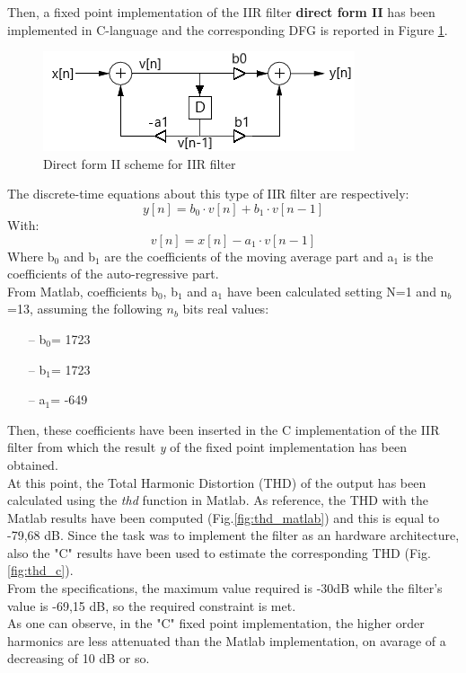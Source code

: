 \documentclass[a4paper, titlepage]{article}
\begin{document}
\noindent
\newline
Then, a fixed point implementation of the IIR filter \textbf{direct form II} has been implemented in C-language and the corresponding DFG is reported in Figure \ref{fig:IIR filter scheme}.
\begin{figure} [h]
\centering
	\includegraphics[scale=0.9]{IIR_filter_scheme.png}
	\caption{Direct form II scheme for IIR filter}
	\label{fig:IIR filter scheme}
\end{figure}
\newline
The discrete-time equations about this type of IIR filter are respectively:
\begin{equation}
\label{eq:IIR eq}
    y[n]=b_0\cdot v[n]+b_1\cdot v[n-1]
\end{equation}
With:
\begin{equation}
\label{eq:IIR eq v[n]}
    v[n]=x[n]-a_1\cdot v[n-1]
\end{equation}
Where b$_0$ and b$_1$ are the coefficients of the moving average part and a$_1$ is the coefficients of the auto-regressive part.\\
From Matlab, coefficients b$_0$, b$_1$ and a$_1$ have been calculated setting N=1 and n$_b$=13, assuming the following $n_b$ bits real values:
\begin{itemize}
    \item[--] b$_0$= 1723
    \item[--] b$_1$= 1723
    \item[--] a$_1$= -649
\end{itemize}
 Then, these coefficients have been inserted in the C implementation of the IIR filter from which the result \textit{y} of the fixed point implementation has been obtained.\\ 
At this point, the Total Harmonic Distortion (THD) of the output has been calculated using the \textit{thd} function in Matlab. As reference, the THD with the Matlab results have been computed (Fig.\ref{fig:thd_matlab}) and this is equal to -79,68 dB. Since the task was to implement the filter as an hardware architecture, also the "C" results have been used to estimate the corresponding THD (Fig.\ref{fig:thd_c}).\\
From the specifications, the maximum value required is -30dB while the filter's value is -69,15 dB, so the required constraint is met.\\
As one can observe, in the "C" fixed point implementation, the higher order harmonics are less attenuated than the Matlab implementation, on avarage of a decreasing of 10 dB or so.
\end{document}
